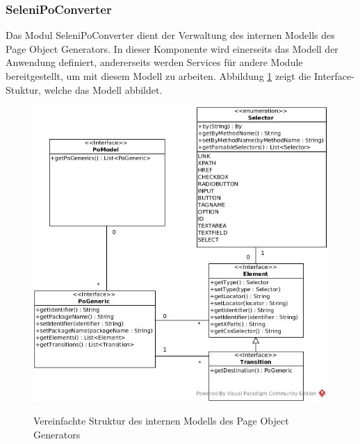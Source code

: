 \subsubsection{SeleniPoConverter}
\label{sec:selenipoconverter}
Das Modul SeleniPoConverter dient der Verwaltung des internen Modells des Page Object Generators. In dieser Komponente wird einerseits das Modell der Anwendung definiert, andererseits werden Services für andere Module bereitgestellt, um mit diesem Modell zu arbeiten.
Abbildung \ref{fig:simple_model} zeigt die Interface-Stuktur, welche das Modell abbildet.

\begin{figure}[htb]
  \centering  
  \includegraphics[scale=0.46]{img/SimpleModel.jpg}\\
  \caption{Vereinfachte Struktur des internen Modells des Page Object Generators}
  \label{fig:simple_model}
\end{figure}

